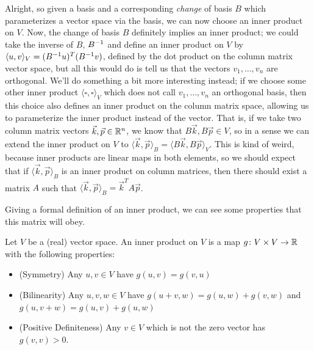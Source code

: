 \documentclass[11pt]{article}
\begin{document}
Alright, so given a basis and a corresponding \emph{change} of basis $B$ which parameterizes a vector space via the basis, we can now choose an inner product on $V$. Now, the change of basis $B$ definitely implies an inner product; we could take the inverse of $B$, $B^{-1}$ and define an inner product on $V$ by $\langle u,v \rangle_V = (B^{-1} u)^T (B^{-1} v)$, defined by the dot product on the column matrix vector space, but all this would do is tell us that the vectors $v_1, \dots, v_n$ are orthogonal. We'll do something a bit more interesting instead; if we choose some other inner product $\langle \square, \square \rangle_V$ which does not call $v_1, \dots, v_n$ an orthogonal basis, then this choice also defines an inner product on the column matrix space, allowing us to parameterize the inner product instead of the vector. That is, if we take two column matrix vectors $\vec k, \vec p \in \mathbb{R}^n$, we know that $B \vec k, B \vec p \in V$, so in a sense we can extend the inner product on $V$ to $\langle \vec k, \vec p \rangle_{B} = \langle B \vec k, B \vec p \rangle_{V}$. This is kind of weird, because inner products are linear maps in both elements, so we should expect that if $\langle \vec k , \vec p \rangle_{B}$ is an inner product on column matrices, then there should exist a matrix $A$ such that $\langle \vec k , \vec p \rangle_{B} = \vec k^T A \vec p$.

Giving a formal definition of an inner product, we can see some properties that this matrix will obey.

\begin{definition}
Let $V$ be a (real) vector space. An inner product on $V$ is a map $g \colon V \times V \to \mathbb{R}$ with the following properties: \begin{itemize}
\item (Symmetry) Any $u,v\in V$ have $g(u,v) = g(v,u)$
\item (Bilinearity) Any $u,v,w \in V$ have $g(u + v, w) = g(u,w) + g(v,w)$ and $g(u, v + w) = g(u,v) + g(u,w)$
\item (Positive Definiteness) Any $v \in V$ which is not the zero vector has $g(v,v) > 0$.
\end{itemize}
\end{definition}
\end{document}
